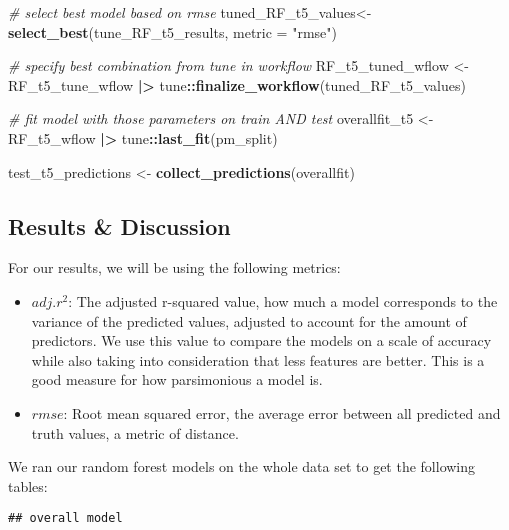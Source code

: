 \documentclass[
]{article}
\newenvironment{Shaded}{\begin{snugshade}}{\end{snugshade}}
\newcommand{\AttributeTok}[1]{\textcolor[rgb]{0.13,0.29,0.53}{#1}}
\newcommand{\CommentTok}[1]{\textcolor[rgb]{0.56,0.35,0.01}{\textit{#1}}}
\newcommand{\FunctionTok}[1]{\textcolor[rgb]{0.13,0.29,0.53}{\textbf{#1}}}
\newcommand{\NormalTok}[1]{#1}
\newcommand{\OtherTok}[1]{\textcolor[rgb]{0.56,0.35,0.01}{#1}}
\newcommand{\SpecialCharTok}[1]{\textcolor[rgb]{0.81,0.36,0.00}{\textbf{#1}}}
\newcommand{\StringTok}[1]{\textcolor[rgb]{0.31,0.60,0.02}{#1}}
\providecommand{\tightlist}{%
  \setlength{\itemsep}{0pt}\setlength{\parskip}{0pt}}
\begin{document}
\begin{Shaded}
\begin{Highlighting}[]
\CommentTok{\# select best model based on rmse}
\NormalTok{tuned\_RF\_t5\_values}\OtherTok{\textless{}{-}} \FunctionTok{select\_best}\NormalTok{(tune\_RF\_t5\_results, }\AttributeTok{metric =} \StringTok{"rmse"}\NormalTok{)}

\CommentTok{\# specify best combination from tune in workflow}
\NormalTok{RF\_t5\_tuned\_wflow }\OtherTok{\textless{}{-}}\NormalTok{RF\_t5\_tune\_wflow }\SpecialCharTok{|\textgreater{}}
\NormalTok{  tune}\SpecialCharTok{::}\FunctionTok{finalize\_workflow}\NormalTok{(tuned\_RF\_t5\_values)}

\CommentTok{\# fit model with those parameters on train AND test}
\NormalTok{overallfit\_t5 }\OtherTok{\textless{}{-}}\NormalTok{ RF\_t5\_wflow }\SpecialCharTok{|\textgreater{}}
\NormalTok{  tune}\SpecialCharTok{::}\FunctionTok{last\_fit}\NormalTok{(pm\_split)}

\NormalTok{test\_t5\_predictions }\OtherTok{\textless{}{-}} \FunctionTok{collect\_predictions}\NormalTok{(overallfit)}
\end{Highlighting}
\end{Shaded}

\subsection{Results \& Discussion}\label{results-discussion}

For our results, we will be using the following metrics:

\begin{itemize}
\tightlist
\item
  \(adj. r^2\): The adjusted r-squared value, how much a model
  corresponds to the variance of the predicted values, adjusted to
  account for the amount of predictors. We use this value to compare the
  models on a scale of accuracy while also taking into consideration
  that less features are better. This is a good measure for how
  parsimonious a model is.
\item
  \(rmse\): Root mean squared error, the average error between all
  predicted and truth values, a metric of distance.
\end{itemize}

We ran our random forest models on the whole data set to get the
following tables:

\begin{verbatim}
## overall model
\end{verbatim}
\end{document}
